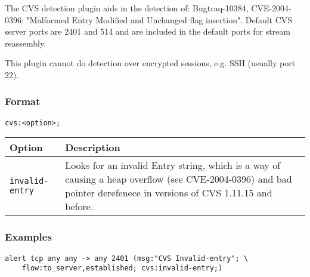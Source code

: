 \documentclass[english]{report}
\newenvironment{note}{
\samepage
    \vspace{10pt}{\textsf{
        {\hspace{7pt}\Huge{$\triangle$\hspace{-12.5pt}{\Large{$^!$}}}}\hspace{5pt}
        {\Large{NOTE}}
    }
    }
   \begin{center}
    \par\vspace{-17pt}

    \begin{lrbox}{\savepar}
    \begin{minipage}[r]{6in}
}
{
    \end{minipage}
    \end{lrbox}
    \fbox{
        \usebox{
            \savepar
	}
    }
    \par\vskip10pt
    \end{center}
}
\begin{document}
The CVS detection plugin aids in the detection of: Bugtraq-10384, CVE-2004-0396: "Malformed Entry Modified and Unchanged flag insertion".  Default CVS server ports are 2401 and 514 and are included in the default ports for stream reassembly.

\begin{note}
This plugin cannot do detection over encrypted sessions, e.g. SSH (usually port 22).
\end{note}

\subsubsection{Format}

\begin{verbatim}
cvs:<option>;
\end{verbatim}

\begin{tabular}{| l | p{5in} |}
\hline
{\bf Option} & {\bf Description}\\
\hline
\hline
\texttt{invalid-entry} & Looks for an invalid Entry string, which is a way of causing a heap overflow (see CVE-2004-0396) and bad pointer derefenece in versions of CVS 1.11.15 and before.\\
\hline
\end{tabular}

\subsubsection{Examples}

\begin{verbatim}
alert tcp any any -> any 2401 (msg:"CVS Invalid-entry"; \
    flow:to_server,established; cvs:invalid-entry;)
\end{verbatim}



%

%
%
%
%
\end{document}
